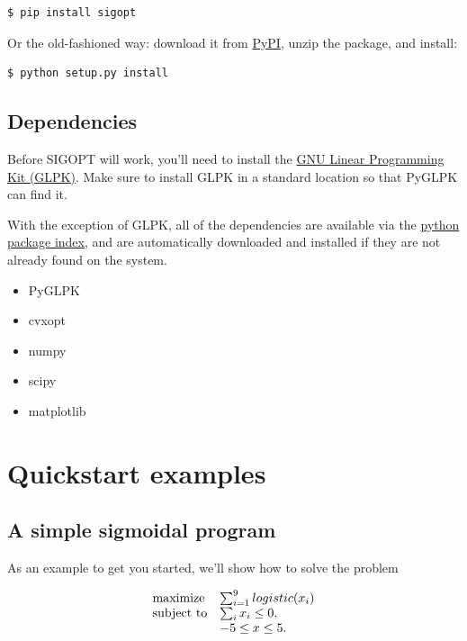 \documentclass[letterpaper,10pt,english]{/Users/madeleineudell/anaconda/lib/python2.7/site-packages/sphinx/texinputs/sphinxhowto}
\begin{document}
\begin{verbatim}
$ pip install sigopt
\end{verbatim}

Or the old-fashioned way: download it from
\href{https://pypi.python.org/pypi?\%3Aaction=search\&term=sigopt\&submit=search}{PyPI},
unzip the package, and install:

\begin{verbatim}
$ python setup.py install
\end{verbatim}

\subsection{Dependencies}

Before SIGOPT will work, you'll need to install the
\href{http://www.gnu.org/software/glpk/}{GNU Linear Programming Kit
(GLPK)}. Make sure to install GLPK in a standard location so that PyGLPK
can find it.

With the exception of GLPK, all of the dependencies are available via
the \href{https://pypi.python.org}{python package index}, and are
automatically downloaded and installed if they are not already found on
the system.

\begin{itemize}
\itemsep1pt\parskip0pt
\item
  PyGLPK
\item
  cvxopt
\item
  numpy
\item
  scipy
\item
  matplotlib
\end{itemize}\section{Quickstart examples}

\subsection{A simple sigmoidal program}

As an example to get you started, we'll show how to solve the problem

\[
\begin{array}{ll}
\mbox{\textrm{maximize}} & \sum_{i=1}^9 \mathop{logistic}(x_i) \\
\mbox{subject to} & \sum_i x_i \leq 0, \\
& -5 \leq x \leq 5.
\end{array}
\]
\end{document}
